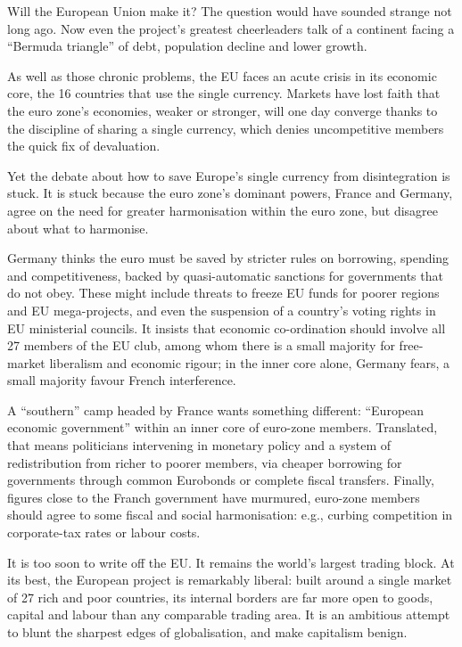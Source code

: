 Will the European Union make it? The question would have sounded strange not long ago. Now even the project's greatest cheerleaders talk of a continent facing a ``Bermuda triangle'' of debt, population decline and lower growth.


As well as those chronic problems, the EU faces an acute crisis in its economic core, the 16 countries that use the single currency. Markets have lost faith that the euro zone's economies, weaker or stronger, will one day converge thanks to the discipline of sharing a single currency, which denies uncompetitive members the quick fix of devaluation.


Yet the debate about how to save Europe's single currency from disintegration is stuck. It is stuck because the euro zone's dominant powers, France and Germany, agree on the need for greater harmonisation within the euro zone, but disagree about what to harmonise.


Germany thinks the euro must be saved by stricter rules on borrowing, spending and competitiveness, backed by quasi-automatic sanctions for governments that do not obey. These might include threats to freeze EU funds for poorer regions and EU mega-projects, and even the suspension of a country's voting rights in EU ministerial councils. It insists that economic co-ordination should involve all 27 members of the EU club, among whom there is a small majority for free-market liberalism and economic rigour; in the inner core alone, Germany fears, a small majority favour French interference.


A ``southern'' camp headed by France wants something different: ``European economic government'' within an inner core of euro-zone members. Translated, that means politicians intervening in monetary policy and a system of redistribution from richer to poorer members, via cheaper borrowing for governments through common Eurobonds or complete fiscal transfers. Finally, figures close to the Franch government have murmured, euro-zone members should agree to some fiscal and social harmonisation: e.g., curbing competition in corporate-tax rates or labour costs.


It is too soon to write off the EU. It remains the world's largest trading block.  At its best, the European project is remarkably liberal: built around a single market of 27 rich and poor countries, its internal borders are far more open to goods, capital and labour than any comparable trading area. It is an ambitious attempt to blunt the sharpest edges of globalisation, and make capitalism benign.


